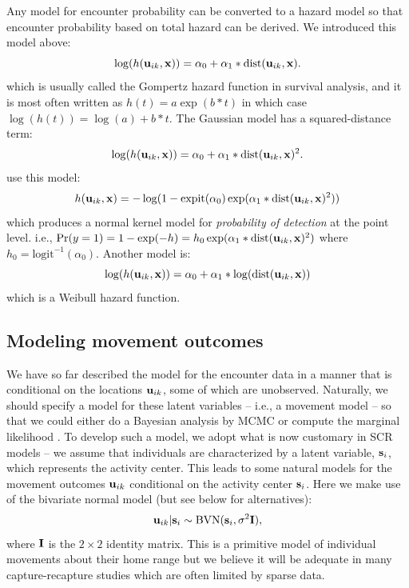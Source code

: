 Any model for encounter probability can be converted to a hazard model
so that encounter probability based on total hazard can be derived.
We introduced this model above:
\[
\log(h({\bf u}_{ik},{\bf x})) = \alpha_{0} + \alpha_{1}*\mbox{dist}({\bf u}_{ik},{\bf x}).
\]
which is usually called the Gompertz hazard function in survival
analysis, and it is most often written as $h(t) = a \exp( b*t)$ in which
case $\log(h(t)) = \log(a) + b*t$.  
The Gaussian model has a  squared-distance term:
\[
\log(h({\bf u}_{ik},{\bf x})) = \alpha_{0} + \alpha_{1}*\mbox{dist}({\bf u}_{ik},{\bf x})^2.
\]
 \citet{borchers_efford:2008} use this model:
\[
h({\bf u}_{ik},{\bf x} ) = -\log(1 - \mbox{expit}(\alpha_{0})
\exp( \alpha_{1}*\mbox{dist}({\bf u}_{ik},{\bf x})^2 ) )
\]
which produces a normal kernel model for {\it probability of
  detection} at the point level. i.e., $\Pr(y=1) = 1-\exp(-h) = h_{0}
\exp( \alpha_{1}*\mbox{dist}({\bf u}_{ik},{\bf x})^2 )$ where $h_{0} =
\mbox{logit}^{-1}(\alpha_{0})$.  
Another model is:
\[
\log(h({\bf u}_{ik},{\bf x})) = \alpha_{0} + \alpha_{1}*\log(\mbox{dist}({\bf u}_{ik},{\bf x}))
\]
which is a Weibull hazard function.



\subsection{Modeling movement outcomes}

We have so far described the model for the encounter data in a manner
that is conditional on the locations ${\bf u}_{ik}$, some of which are
unobserved. Naturally, we should specify a model for these latent
variables -- i.e., a movement model -- so that we could either do a
Bayesian analysis by MCMC \citep{royle_young:2008, royle_etal:2011} or
compute the marginal likelihood \citep{efford:2011}.  To develop such
a model, we adopt what is now customary in SCR models -- we assume
that individuals are characterized by a latent variable, ${\bf
  s}_{i}$, which represents the activity center.  This leads to some
natural models for the movement outcomes ${\bf u}_{ik}$ conditional on
the activity center ${\bf s}_{i}$. Here we make use of the bivariate
normal model (but see below for alternatives):
\[
 {\bf u}_{ik} | {\bf s}_{i} \sim \mbox{BVN}({\bf s}_{i}, \sigma^{2}{\bf I}),
\]
where ${\bf I}$ is the $2\times 2$ identity matrix.  
This is a primitive model of individual movements about their home
range but we believe it will be adequate in many capture-recapture
studies which are often limited by sparse data.

